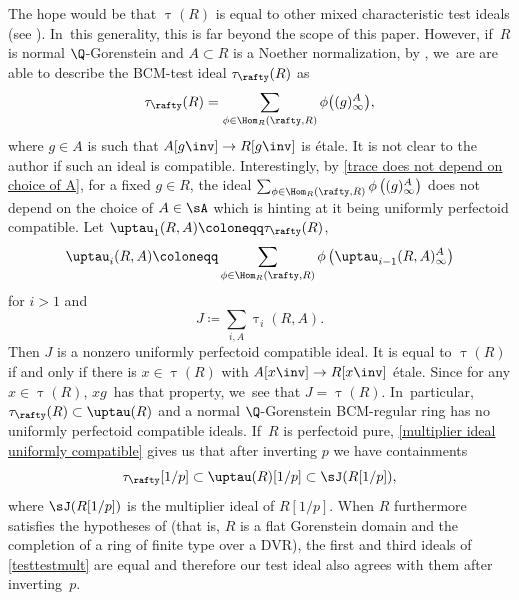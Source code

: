 \begin{remark}
The hope would be that $\uptau(R)$ is equal to other mixed characteristic test ideals (see \cite{MaSchwedePerfectoidTestIdeal,HaconLamarcheSchwedeGlobalGenTestIdeal,BMPSTWWMinimalModelProgramMixedCharacteristic,BMPSTWWDTestIdealPerturbation,MurayamaUniformBoundsSymbolicPowers,RobinsonBCMTestIdealToric,SatoTakagiDeformationFPureFreg,PerezRGCharacteristicFreeTestIdeals}). In~this generality, this is far beyond the scope of this paper. However, if~$R$ is normal $\Q$-Gorenstein and $A\subset R$ is a Noether normalization, by \cite[Lem.\,5.1.6]{CaiLeeMaSchwedeTuckerPerfectoidSignature}, we~are are able to describe the BCM-test ideal $\tau_{\rafty}(R)$ as
\[
\tau_{\rafty}(R)=\sum_{\phi\in \Hom_R\left(\rafty,R\right)}\phi\bigl((g)^A_\infty\bigr),
\]
where $g\in A$ is such that $A[g\inv]\to R[g\inv]$ is étale.
It is not clear to the author if such an ideal is compatible. Interestingly, by \autoref{trace does not depend on choice of A}, for a fixed $g\in R$, the ideal $\sum_{\phi\in \Hom_R\left(\rafty,R\right)}\phi\left((g)^A_\infty\right)$ does not depend on the choice of $A\in \sA$ which is hinting at it being uniformly perfectoid compatible.
Let $\uptau_1(R,A)\coloneqq \tau_{\rafty}(R)$,
\[\uptau_i(R,A)\coloneqq \sum_{\phi\in \Hom_R\left(\rafty,R\right)}\phi\left(\uptau_{i-1}(R,A)^A_\infty\right)\]
for $i>1$ and
\[
J\coloneqq \sum_{i,A} \uptau_i(R,A).
\]
Then $J$ is a nonzero uniformly perfectoid compatible ideal. It is equal to $\uptau(R)$ if and only if there is $x\in \uptau(R)$ with $A[x\inv]\to R[x\inv]$ étale. Since for any $x\in \uptau(R)$, $xg$~has that property, we~see that $J=\uptau(R)$. In~particular, $\tau_{\rafty}(R)\subset \uptau(R)$ and a normal $\Q$-Gorenstein BCM-regular ring has no uniformly perfectoid compatible ideals. If~$R$ is perfectoid pure, \autoref{multiplier ideal uniformly compatible} gives us that after inverting $p$ we have containments
\begin{equation}\label{testtestmult}
\tau_{\rafty}[1/p]\subset \uptau(R)[1/p]\subset \sJ(R[1/p]),
\end{equation}
where $\sJ(R[1/p])$ is the multiplier ideal of $R[1/p]$.
When $R$ furthermore satisfies the hypotheses of \cite[Th.\,B]{BMPSTWWDTestIdealPerturbation} (that is, $R$ is a flat Gorenstein domain and the completion of a ring of finite type over a DVR), the first and third ideals of \autoref{testtestmult} are equal and therefore our test ideal also agrees with them after inverting~$p$.
\end{remark}

